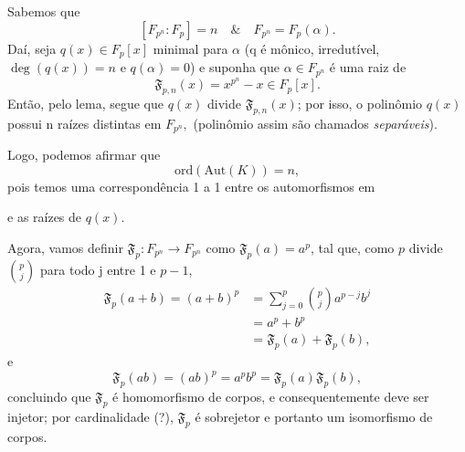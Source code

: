 \documentclass[../algebraIII_notes.tex]{subfiles}
\begin{document}
\begin{proof*}
	Sabemos que
	\[
		[F_{p^{n}}: F_{p}] = n \quad\&\quad F_{p^{n}} = F_{p}(\alpha ).
	\]
	Daí, seja \(q(x)\in F_{p}[x]\) minimal para \(\alpha \) (q é mônico, irredutível, \(\deg{(q(x))}=n\) e \(q(\alpha )=0\)) e suponha que \(\alpha\in F_{p^{n}} \) é uma raiz de
	\[
		\mathfrak{F}_{p, n}(x) = x^{p^{n}}-x\in F_{p}[x].
	\]
	Então, pelo lema, segue que \(q(x)\) divide \(\mathfrak{F}_{p, n}(x)\); por isso, o polinômio \(q(x)\) possui n raízes distintas em \(F_{p^{n}},\) (polinômio assim são chamados \textit{separáveis}).

	Logo, podemos afirmar que
	\[
		\mathrm{ord}(\mathrm{Aut}(K)) = n,
	\]
	pois temos uma correspondência 1 a 1 entre os automorfismos em
	\begin{center}
	\end{center}
	e as raízes de \(q(x)\).

	Agora, vamos definir \(\mathfrak{F}_{p}:F_{p^{n}}\rightarrow F_{p^{n}}\) como \(\mathfrak{F}_{p}(a) = a^{p}\), tal que, como \(p\) divide \(\binom{p}{j}\) para todo j entre 1 e \(p-1\),
	\begin{align*}
		\mathfrak{F}_{p}(a+b) = (a+b)^{p} & =\sum\limits_{j=0}^{p}\binom{p}{j}a^{p-j}b^{j} \\
		                                  & = a^{p}+b^{p}                                  \\
		                                  & = \mathfrak{F}_{p}(a) + \mathfrak{F}_{p}(b),
	\end{align*}
	e
	\[
		\mathfrak{F}_p(ab) = (ab)^{p}=a^{p}b^{p} = \mathfrak{F}_p(a)\mathfrak{F}_p(b),
	\]
	concluindo que \(\mathfrak{F}_p\) é homomorfismo de corpos, e consequentemente deve ser injetor; por cardinalidade (?), \(\mathfrak{F}_p\) é sobrejetor e portanto um isomorfismo de corpos.


\end{proof*}
\end{document}
